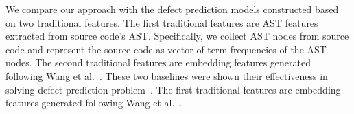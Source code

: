 
We compare our approach with the defect prediction models constructed based on two traditional features. The first traditional features are AST features extracted from source code's AST. Specifically, we collect AST nodes from source code and represent the source code as vector of term frequencies of the AST nodes. The second traditional features are embedding features generated following Wang et al.~\cite{wang2016automatically}. These two baselines were shown their effectiveness in solving defect prediction problem~\cite{wang2016automatically}. The first traditional features are embedding features generated following Wang et al.~\cite{wang2016automatically}.



